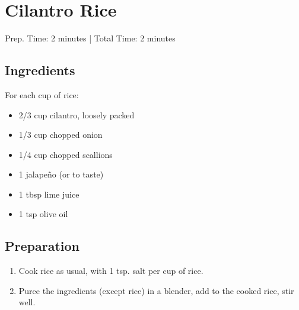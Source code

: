 \section{Cilantro Rice}

\begin{center}
Prep. Time: 2 minutes |
Total Time: 2 minutes
\end{center}

\subsection{Ingredients}
For each cup of rice:
\begin{itemize}
    \item 2/3 cup cilantro, loosely packed
    \item 1/3 cup chopped onion
    \item 1/4 cup chopped scallions
    \item 1 jalape\~{n}o (or to taste)
    \item 1 tbsp lime juice
    \item 1 tsp olive oil
\end{itemize}

\subsection{Preparation}
\begin{enumerate}
    \item Cook rice as usual, with 1 tsp. salt per cup of rice.
    \item Puree the ingredients (except rice) in a blender, add to the cooked rice, stir well.
\end{enumerate}
